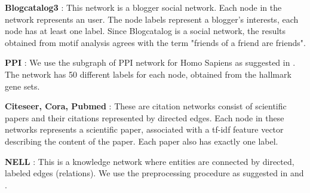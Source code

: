 \documentclass{article}
\theoremstyle{definition}
\begin{document}
\textbf{Blogcatalog3} \cite{blogcatalog}: This network is a blogger social network.
Each node in the network represents an user. The node labels represent a blogger's 
interests, each node has at least one label. Since Blogcatalog is a social network, 
the results obtained from motif analysis agrees with the term "friends of a friend 
are friends".

\textbf{PPI} \cite{PPI}: We use the subgraph of PPI network for Homo Sapiens
as suggested in \cite{node2vec}. The network has 50 different labels for each
node, obtained from the hallmark gene sets.

\textbf{Citeseer, Cora, Pubmed} \cite{crp}: These are citation 
networks consist of scientific papers and their citations represented by directed 
edges. Each node in these networks represents a scientific paper, associated
with a tf-idf feature vector describing the content of the paper. Each paper
also has exactly one label.

\textbf{NELL} \cite{nell}: This is a knowledge network where entities are connected
by directed, labeled edges (relations). We use the preprocessing procedure as
suggested in \cite{gcn} and \cite{planetoid}.

\begin{table}[H]
\centering
{}
\caption{Datasets for unsupervised embeddings}
\label{t:ungraph}
\end{table}

\begin{table}
\centering
{}
\caption{Datasets for semi-supervised embeddings}
\label{t:segraph}
\end{table}
\end{document}
